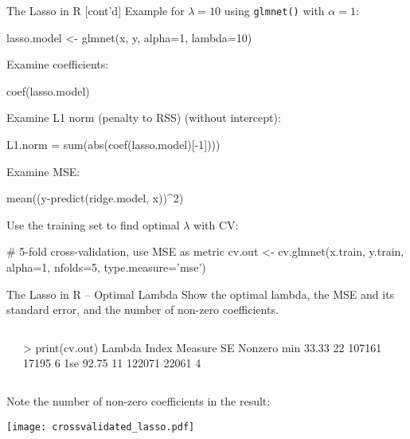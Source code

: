 \documentclass[ignorenonframetext,xcolor=x11names]{beamer}
\begin{document}
\begin{frame}[fragile]{The Lasso in R \small [cont'd]}
\small
Example for $\lambda=10$ using \texttt{glmnet()} with $\alpha=1$:
\begin{Rcode}
lasso.model <- glmnet(x, y, alpha=1, lambda=10)
\end{Rcode}
Examine coefficients:
\begin{Rcode}
coef(lasso.model)
\end{Rcode}
Examine L1 norm (penalty to RSS) (without intercept):
\begin{Rcode}
L1.norm = sum(abs(coef(lasso.model)[-1])))
\end{Rcode}
Examine MSE:
\begin{Rcode}
mean((y-predict(ridge.model, x))^2)
\end{Rcode}

Use the training set to find optimal $\lambda$ with CV:
\begin{Rcode}
# 5-fold cross-validation, use MSE as metric
cv.out <- cv.glmnet(x.train, y.train, alpha=1, 
                    nfolds=5, type.measure='mse')
\end{Rcode}
\end{frame}

\begin{frame}[fragile]{The Lasso in R -- Optimal Lambda}
\small
Show the optimal lambda, the MSE and its standard error, and the number of non-zero coefficients.
\begin{columns}
\begin{column}{.35\textwidth}
\end{column}
\begin{column}{.65\textwidth}
\begin{textcode}
> print(cv.out)
    Lambda Index Measure    SE Nonzero
min  33.33    22  107161 17195       6
1se  92.75    11  122071 22061       4
\end{textcode}
\end{column}
\end{columns}
Note the number of non-zero coefficients in the result:
\begin{center}
\texttt{[image: crossvalidated\_lasso.pdf]}
\end{center}
\end{frame}
\end{document}

